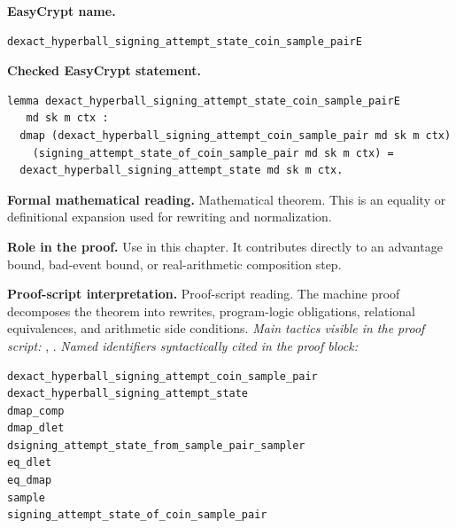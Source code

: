 \begin{formaltheorem}
\noindent\textbf{EasyCrypt name.}
\begin{lstlisting}[language=EasyCrypt,basicstyle=\ttfamily\scriptsize]
dexact_hyperball_signing_attempt_state_coin_sample_pairE
\end{lstlisting}
\noindent\textbf{Checked EasyCrypt statement.}
\begin{lstlisting}[language=EasyCrypt,basicstyle=\ttfamily\scriptsize]
lemma dexact_hyperball_signing_attempt_state_coin_sample_pairE
   md sk m ctx :
  dmap (dexact_hyperball_signing_attempt_coin_sample_pair md sk m ctx)
    (signing_attempt_state_of_coin_sample_pair md sk m ctx) =
  dexact_hyperball_signing_attempt_state md sk m ctx.
\end{lstlisting}
\noindent\textbf{Formal mathematical reading.}
Mathematical theorem. This is an equality or definitional expansion used for rewriting and normalization.

\noindent\textbf{Role in the proof.}
Use in this chapter. It contributes directly to an advantage bound, bad-event bound, or real-arithmetic composition step.

\noindent\textbf{Proof-script interpretation.}
Proof-script reading. The machine proof decomposes the theorem into rewrites, program-logic obligations, relational equivalences, and arithmetic side conditions.
\emph{Main tactics visible in the proof script:} , .
\emph{Named identifiers syntactically cited in the proof block:}
\begin{lstlisting}[language=EasyCrypt,basicstyle=\ttfamily\scriptsize]
dexact_hyperball_signing_attempt_coin_sample_pair
dexact_hyperball_signing_attempt_state
dmap_comp
dmap_dlet
dsigning_attempt_state_from_sample_pair_sampler
eq_dlet
eq_dmap
sample
signing_attempt_state_of_coin_sample_pair
\end{lstlisting}

\end{formaltheorem}

